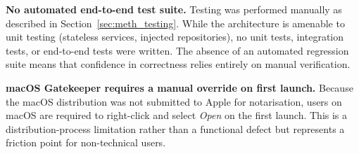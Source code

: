 \textbf{No automated end-to-end test suite.}
Testing was performed manually as described in Section~\ref{sec:meth_testing}.
While the architecture is amenable to unit testing (stateless services, injected
repositories), no unit tests, integration tests, or end-to-end tests were written.
The absence of an automated regression suite means that confidence in correctness relies
entirely on manual verification.

\textbf{macOS Gatekeeper requires a manual override on first launch.}
Because the macOS distribution was not submitted to Apple for notarisation, users on
macOS are required to right-click and select \emph{Open} on the first launch.
This is a distribution-process limitation rather than a functional defect but
represents a friction point for non-technical users.

